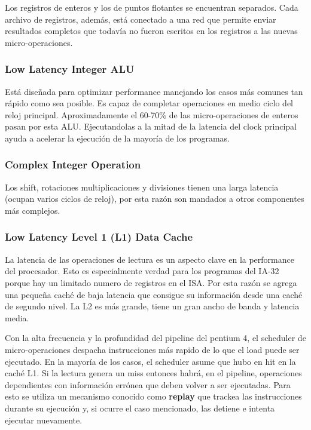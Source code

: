 Los registros de enteros y los de puntos flotantes se encuentran separados. Cada archivo de registros, además, está conectado a una red que permite enviar resultados completos que todavía no fueron escritos en los registros a las nuevas micro-operaciones.

\subsubsection*{Low Latency Integer ALU}
Está diseñada para optimizar performance manejando los casos más comunes tan rápido como sea posible. Es capaz de completar operaciones en medio ciclo del reloj principal. Aproximadamente el 60-70\% de las micro-operaciones de enteros pasan por esta ALU. Ejecutandolas a la mitad de la latencia del clock principal ayuda a acelerar la ejecución de la mayoría de los programas.

\subsubsection*{Complex Integer Operation}
Los shift, rotaciones multiplicaciones y divisiones tienen una larga latencia (ocupan varios ciclos de reloj), por esta razón son mandados a otros componentes más complejos. 

\subsubsection*{Low Latency Level 1 (L1) Data Cache}
La latencia de las operaciones de lectura es un aspecto clave en la performance del procesador. Esto es especialmente verdad para los programas del IA-32 porque hay un limitado numero de registros en el ISA. Por esta razón se agrega una pequeña caché de baja latencia que consigue su información desde una caché de segundo nivel. La L2 es más grande, tiene un gran ancho de banda y latencia media.

Con la alta frecuencia y la profundidad del pipeline del pentium 4, el scheduler de micro-operaciones despacha instrucciones más rapido de lo que el load puede ser ejecutado. En la mayoría de los casos, el scheduler asume que hubo en hit en la caché L1. Si la lectura genera un miss entonces habrá, en el pipeline, operaciones dependientes con información errónea que deben volver a ser ejecutadas. Para esto se utiliza un mecanismo conocido como \textbf{replay} que trackea las instrucciones durante su ejecución y, si ocurre el caso mencionado, las detiene e intenta ejecutar nuevamente. 

